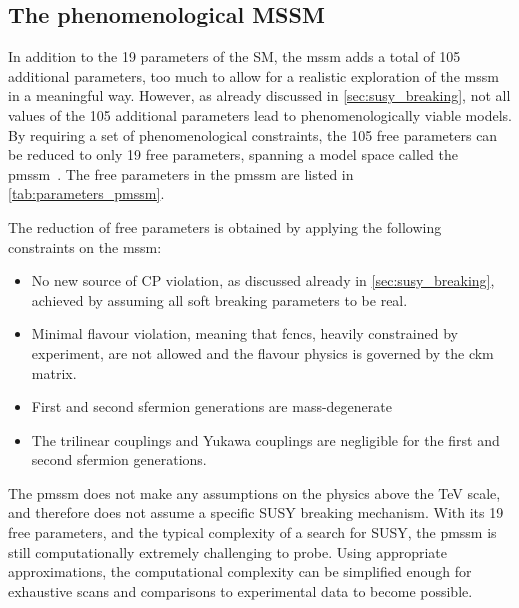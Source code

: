 \subsection{The phenomenological MSSM}\label{sec:theory_pmssm}

In addition to the 19 parameters of the SM, the \gls{mssm} adds a total of 105 additional parameters, too much to allow for a realistic exploration of the \gls{mssm} in a meaningful way. However, as already discussed in \cref{sec:susy_breaking}, not all values of the 105 additional parameters lead to phenomenologically viable models. By requiring a set of phenomenological constraints, the 105 free parameters can be reduced to only 19 free parameters, spanning a model space called the \gls{pmssm}~\cite{Djouadi:2002ze,Berger_2009}. The free parameters in the \gls{pmssm} are listed in \cref{tab:parameters_pmssm}.

The reduction of free parameters is obtained by applying the following constraints on the \gls{mssm}:
\begin{itemize}
	\item No new source of CP violation, as discussed already in \cref{sec:susy_breaking}, achieved by assuming all soft breaking parameters to be real.
	\item Minimal flavour violation, meaning that \glspl{fcnc}, heavily constrained by experiment, are not allowed and the flavour physics is governed by the \gls{ckm} matrix.
	\item First and second sfermion generations are mass-degenerate
	\item The trilinear couplings and Yukawa couplings are negligible for the first and second sfermion generations.
\end{itemize}
The \gls{pmssm} does not make any assumptions on the physics above the TeV scale, and therefore does not assume a specific SUSY breaking mechanism. With its 19 free parameters, and the typical complexity of a search for SUSY, the \gls{pmssm} is still computationally extremely challenging to probe. Using appropriate approximations, the computational complexity can be simplified enough for exhaustive scans and comparisons to experimental data to become possible. 

